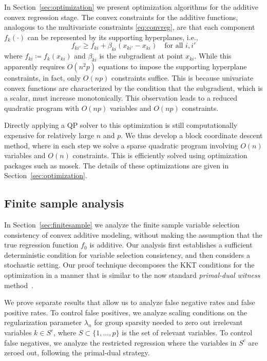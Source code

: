 In Section~\ref{sec:optimization} we present optimization algorithms for the additive convex regression stage.
The convex constraints for the additive functions, analogous to 
the multivariate constraints \eqref{eq:convreg},
are  that each component $f_{k}(\cdot)$ 
can be represented by its supporting hyperplanes, i.e.,
\begin{equation}
      f_{ki'} \geq f_{ki} + \beta_{ki}(x_{ki'}-x_{ki}) \quad \text{for
        all $i,i'$}
\end{equation}
where $f_{ki}\coloneqq f_{k}(x_{ki})$ and $\beta_{ki}$ is the
subgradient at point $x_{ki}$. While this apparently requires $O(n^2
p)$ equations to impose the supporting hyperplane constraints, 
in fact, only $O(np)$ constraints suffice.  This is because univariate convex functions are
characterized by the condition that the subgradient, which is a scalar, must
increase monotonically. This observation leads to a reduced quadratic
program with $O(np)$ variables and $O(np)$ constraints. 

Directly applying a QP solver to this optimization is still computationally
expensive for relatively large
$n$ and $p$.  We thus develop a block
coordinate descent method, where in each step we solve a sparse
quadratic program involving $O(n)$ variables and $O(n)$ constraints.  This 
is efficiently solved using optimization packages 
such as {\sc mosek}.  The details of these optimizations
are given in Section~\ref{sec:optimization}.


\subsection{Finite sample analysis}


In Section~\ref{sec:finitesample} 
we analyze the finite sample variable selection consistency of convex
additive modeling, without making the assumption that the true
regression function $f_0$ is additive.  Our analysis first establishes
a sufficient deterministic condition for variable selection 
consistency, and then considers a stochastic setting.
Our proof technique decomposes the KKT conditions for the optimization
in a manner that is similar to the now standard \emph{primal-dual
  witness} method~\citep{wainwright2009sharp}. 

We prove separate results that allow us to analyze false negative
rates and false positive rates.  To control false positives,
we analyze scaling conditions on the regularization parameter
$\lambda_n$ for 
group sparsity needed to zero out irrelevant variables
$k \in S^c$, where $S\subset \{1,\ldots, p\}$ is the set of
relevant variables. 
To control false negatives, we analyze the restricted regression
where the variables in $S^c$ are zeroed out, following the primal-dual
strategy.  

